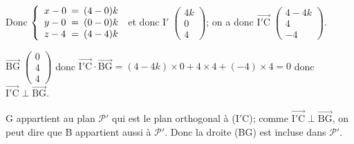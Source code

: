 \documentclass[10pt]{article}
\providecommand{\vectt}[1]{\overrightarrow{\mathrm{#1}}}
\begin{document}
\begin{enumerate}
\begin{enumerate}
Donc
$\left \{
\begin{array}{l !{=} l}
x-0 & (4-0)k\\
y-0 & (0-0)k\\
z-4 & (4-4)k
\end{array}
\right .$ et donc
I$' \;\begin{pmatrix}
4k \\ 0 \\ 4
\end{pmatrix}$; on a donc
$\vectt{I'C}\;\begin{pmatrix}
4-4k \\ 4 \\ -4
\end{pmatrix}$.

$\vectt{BG}\;\begin{pmatrix} 0 \\ 4 \\ 4 \end{pmatrix}$
donc
$\vectt{I'C}\cdot \vectt{BG}=(4-4k)\times 0 + 4\times 4 +(-4)\times 4=0$ donc
$\vectt{I'C}\perp \vectt{BG}$.

G appartient au plan $\mathcal{P}'$ qui est le plan orthogonal à (I$'$C); comme $\vectt{I'C}\perp \vectt{BG}$, on peut dire que B appartient aussi à $\mathcal{P}'$. Donc la droite (BG) est incluse dans $\mathcal{P}'$.


	\end{enumerate}
\end{enumerate}
\end{document}
